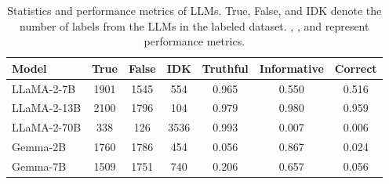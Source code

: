 



\begin{table}[t]
    \centering\small
    \begin{tabular}{l|ccc|ccc}
    \toprule
    \textbf{Model} & \textbf{True} & \textbf{False} & \textbf{IDK} & \textbf{Truthful} & \textbf{Informative} & \textbf{Correct} \\ 
    \midrule
    LLaMA-2-7B & 1901 & 1545 & 554 & 0.965 & 0.550 & 0.516 \\
    LLaMA-2-13B & 2100 & 1796 & 104 & 0.979 & 0.980 & 0.959 \\
    LLaMA-2-70B & 338 & 126 & 3536 & 0.993 & 0.007 & 0.006 \\
    Gemma-2B & 1760 & 1786 & 454 & 0.056 & 0.867 & 0.024 \\
    Gemma-7B & 1509 & 1751 & 740 & 0.206 & 0.657 & 0.056 \\
    \bottomrule
    \end{tabular}
    \caption{Statistics and performance metrics of LLMs. True, False, and IDK denote the number of labels from the LLMs in the labeled dataset. \Truthful, \Informative, and \Correct{} represent performance metrics.}
    \label{tab:llm_stat}
    \vspace{-3mm}
\end{table}

